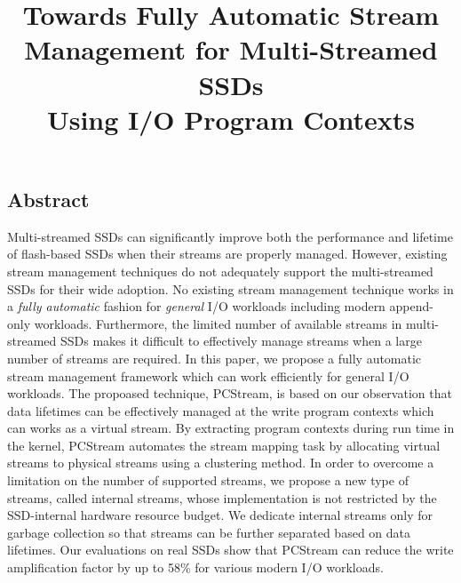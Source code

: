 \documentclass[letterpaper, twocolumn, 10pt]{article}
\begin{document}
\title{
\bf Towards Fully Automatic Stream Management for Multi-Streamed SSDs \\ Using I/O Program Contexts}

%


\maketitle
\pagestyle{empty}
\subsection*{Abstract}
Multi-streamed SSDs
can significantly improve both the performance and lifetime of flash-based SSDs
when their streams are properly managed.  
However, existing stream management techniques do not adequately 
support the multi-streamed SSDs for their wide adoption.
No existing stream management technique works in a {\it fully automatic} fashion 
for {\it general} I/O workloads including modern append-only workloads.  
Furthermore, the limited number of available
streams in multi-streamed SSDs makes it difficult to effectively manage streams 
when a large number of streams are required.
In this paper, we propose a fully automatic stream
management framework which can work efficiently for general I/O workloads.
The propoased technique, PCStream, is based on our observation that data lifetimes 
can be effectively managed at the write program contexts which can works
as a virtual stream.
By extracting program contexts during run time in the kernel, PCStream automates 
the stream mapping task by allocating virtual streams to physical
streams using a clustering method.
In order to overcome a limitation on the number of supported streams, we propose a new 
type of streams, called internal streams, whose implementation is not restricted by 
the SSD-internal hardware resource budget.
We dedicate internal streams only for garbage collection so that streams 
can be further separated based on data lifetimes.
Our evaluations on real SSDs show that PCStream can reduce the write amplification factor 
by up to 58\% for various modern I/O workloads.










\end{document}
